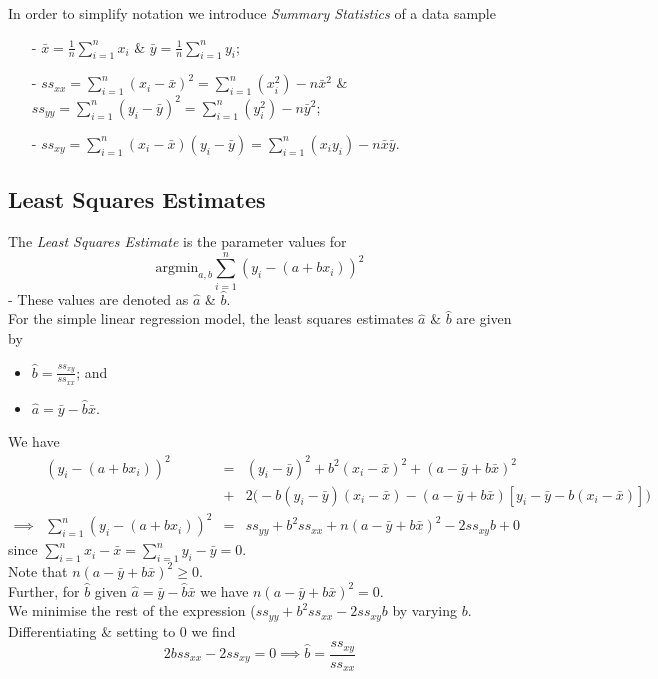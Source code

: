\documentclass[11pt,a4paper]{article}
\begin{document}
In order to simplify notation we introduce \textit{Summary Statistics} of a data sample
\begin{itemize}
	\item[-] $\bar{x}=\frac{1}{n}\sum_{i=1}^nx_i$ \& $\bar{y}=\frac{1}{n}\sum_{i=1}^ny_i$;
	\item[-] $ss_{xx}=\sum_{i=1}^n(x_i-\bar{x})^2=\sum_{i=1}^n\left(x_i^2\right)-n\bar{x}^2$ \& $ss_{yy}=\sum_{i=1}^n(y_i-\bar{y})^2=\sum_{i=1}^n\left(y_i^2\right)-n\bar{y}^2$;
	\item[-] $ss_{xy}=\sum_{i=1}^n(x_i-\bar{x})(y_i-\bar{y})=\sum_{i=1}^n\left(x_iy_i\right)-n\bar{x}\bar{y}$.
\end{itemize}

\subsection{Least Squares Estimates}

The \textit{Least Squares Estimate} is the parameter values for
$$\mathrm{argmin}_{a,b}\sum_{i=1}^n(y_i-(a+bx_i))^2$$
\nb - These values are denoted as $\hat{a}$ \& $\hat{b}$.\\

For the simple linear regression model, the least squares estimates $\hat{a}$ \& $\hat{b}$ are given by
\begin{itemize}
	\item $\hat{b}=\frac{ss_{xy}}{ss_{xx}}$; and
	\item $\hat{a}=\bar{y}-\hat{b}\bar{x}$.
\end{itemize}

We have
\[\begin{array}{rrcl}
&(y_i-(a+bx_i))^2&=&(y_i-\bar{y})^2+b^2(x_i-\bar{x})^2+(a-\bar{y}+b\bar{x})^2\\
&&+&2\big(-b(y_i-\bar{y})(x_i-\bar{x})-(a-\bar{y}+b\bar{x})[y_i-\bar{y}-b(x_i-\bar{x})]\big)\\
\implies&\sum_{i=1}^n(y_i-(a+bx_i))^2&=&ss_{yy}+b^2ss_{xx}+n(a-\bar{y}+b\bar{x})^2-2ss_{xy}b+0
\end{array}\]
since $\sum_{i=1}^nx_i-\bar{x}=\sum_{i=1}^ny_i-\bar{y}=0$.\\
Note that $n(a-\bar{y}+b\bar{x})^2\geq0$.\\
Further, for $\hat{b}$ given $\hat{a}=\bar{y}-\hat{b}\bar{x}$ we have $n(a-\bar{y}+b\bar{x})^2=0$.\\
We minimise the rest of the expression ($ss_{yy}+b^2ss_{xx}-2ss_{xy}b$ by varying $b$.\\
Differentiating  \& setting to 0 we find
$$2bss_{xx}-2ss_{xy}=0\implies\hat{b}=\frac{ss_{xy}}{ss_{xx}}$$
\end{document}
